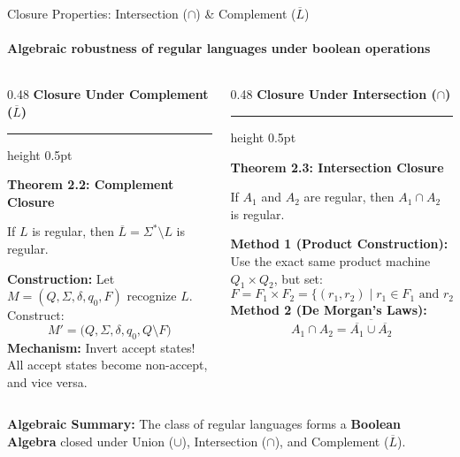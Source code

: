\documentclass[aspectratio=169, 10pt]{beamer}
\newcommand{\colheader}[1]{%
  {\noindent\footnotesize\bfseries\color{gimpanavy}#1}%
  \vspace{0.02cm}%
  {\color{gimpanavy!30}\hrule height 0.5pt}%
  \vspace{0.05cm}%
}
\newcommand{\cardtitle}[1]{{\noindent\footnotesize\bfseries\color{gimpanavy}#1}\par\vspace{0.03cm}}
\newcommand{\greentitle}[1]{{\noindent\footnotesize\bfseries\color{accentGreen}#1}\par\vspace{0.03cm}}
\begin{document}
\begin{frame}{Closure Properties: Intersection ($\cap$) \& Complement ($\overline{L}$)}
  \framesubtitle{Algebraic robustness of regular languages under boolean operations}
  
  \begin{columns}[T]
    \begin{column}{0.48\textwidth}
      \colheader{Closure Under Complement ($\overline{L}$)}
      \begin{tcolorbox}[conceptcard]
        \cardtitle{Theorem 2.2: Complement Closure}
        {\scriptsize
        If $L$ is regular, then $\overline{L} = \Sigma^* \setminus L$ is regular.
        \vspace{0.04cm}
        
        \textbf{Construction:}
        Let $M = (Q, \Sigma, \delta, q_0, F)$ recognize $L$. Construct:
        \[ M' = \bigl(Q, \Sigma, \delta, q_0, Q \setminus F\bigr) \]
        \textbf{Mechanism:} Invert accept states! All accept states become non-accept, and vice versa.
        }
      \end{tcolorbox}
    \end{column}
    
    \begin{column}{0.48\textwidth}
      \colheader{Closure Under Intersection ($\cap$)}
      \begin{tcolorbox}[examplecard]
        \greentitle{Theorem 2.3: Intersection Closure}
        {\scriptsize
        If $A_1$ and $A_2$ are regular, then $A_1 \cap A_2$ is regular.
        \vspace{0.04cm}
        
        \textbf{Method 1 (Product Construction):}
        Use the exact same product machine $Q_1 \times Q_2$, but set:
        \[ F = F_1 \times F_2 = \{(r_1, r_2) \mid r_1 \in F_1 \text{ and } r_2 \in F_2\} \]
        \textbf{Method 2 (De Morgan's Laws):}
        \[ A_1 \cap A_2 = \overline{\overline{A_1} \cup \overline{A_2}} \]
        }
      \end{tcolorbox}
    \end{column}
  \end{columns}
  
  \vspace{0.08cm}
  \begin{tcolorbox}[alertcard]
    {\scriptsize\textbf{Algebraic Summary:} The class of regular languages forms a \textbf{Boolean Algebra} closed under Union ($\cup$), Intersection ($\cap$), and Complement ($\overline{L}$).}
  \end{tcolorbox}
\end{frame}
\end{document}
